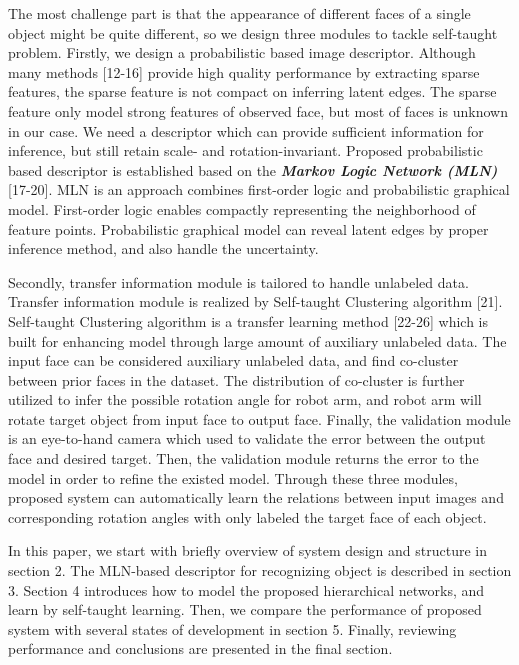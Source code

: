 \documentclass{tADR2e}
\begin{document}
The most challenge part is that the appearance of different faces of a single object might be quite different, so we design three modules to tackle self-taught problem. Firstly, we design a probabilistic based image descriptor. Although many methods [12-16] provide high quality performance by extracting sparse features, the sparse feature is not compact on inferring latent edges. The sparse feature only model strong features of observed face, but most of faces is unknown in our case. We need a descriptor which can provide sufficient information for inference, but still retain scale- and rotation-invariant. Proposed probabilistic based descriptor is established based on the \textit{\textbf{Markov Logic Network (MLN)}} [17-20]. MLN is an approach combines first-order logic and probabilistic graphical model. First-order logic enables compactly representing the neighborhood of feature points. Probabilistic graphical model can reveal latent edges by proper inference method, and also handle the uncertainty.  

Secondly, transfer information module is tailored to handle unlabeled data. Transfer information module is realized by Self-taught Clustering algorithm [21]. Self-taught Clustering algorithm is a transfer learning method [22-26] which is built for enhancing model through large amount of auxiliary unlabeled data. The input face can be considered auxiliary unlabeled data, and find co-cluster between prior faces in the dataset. The distribution of co-cluster is further utilized to infer the possible rotation angle for robot arm, and robot arm will rotate target object from input face to output face. Finally, the validation module is an eye-to-hand camera which used to validate the error between the output face and desired target. Then, the validation module returns the error to the model in order to refine the existed model. Through these three modules, proposed system can automatically learn the relations between input images and corresponding rotation angles with only labeled the target face of each object.

In this paper, we start with briefly overview of system design and structure in section 2. The MLN-based descriptor for recognizing object is described in section 3. Section 4 introduces how to model the proposed hierarchical networks, and learn by self-taught learning. Then, we compare the performance of proposed system with several states of development in section 5. Finally, reviewing performance and conclusions are presented in the final section.
\end{document}
